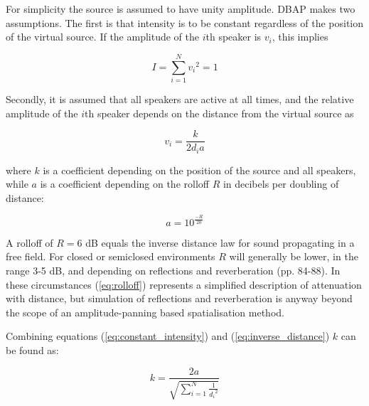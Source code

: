 \documentclass[twoside,10pt]{article}
\begin{document}
For simplicity the source is assumed to have unity amplitude. DBAP makes two assumptions. The first is that intensity is to be constant regardless of the position of the virtual source. If the amplitude of the $i$th speaker is $v_{i}$, this implies

\begin{equation} \label{eq:constant_intensity}
I = \sum_{i=1}^{N} {v_{i}}^2 = 1
\end{equation}

Secondly, it is assumed that all speakers are active at all times, and the relative amplitude of the $i$th speaker depends on the distance from the virtual source as 

\begin{equation} \label{eq:inverse_distance}
v_{i} = \frac{k}{2 d_{i} a} 
\end{equation}

where $k$ is a coefficient depending on the position of the source and all speakers, while $a$ is a coefficient depending on the rolloff $R$ in decibels per doubling of distance:

\begin{equation} \label{eq:rolloff}
	a = 10^{\frac{-R}{20}}
\end{equation}

A rolloff of $R = 6$ dB equals the inverse distance law for sound propagating in a free field. For closed or semiclosed environments $R$ will generally be lower, in the range 3-5 dB, and depending on reflections and reverberation \cite{Everest:2000handbook_acoustics} (pp. 84-88). In these circumstances (\ref{eq:rolloff}) represents a simplified description of attenuation with distance, but simulation of reflections and reverberation is anyway beyond the scope of an amplitude-panning based spatialisation method.


Combining equations (\ref{eq:constant_intensity}) and (\ref{eq:inverse_distance}) $k$ can be found as:

\begin{equation} \label{eq:calculate_k}
k = \frac{2a}{\sqrt{\sum_{i=1}^{N} \frac{1}{{d_{i}}^2}}}
\end{equation}
\end{document}
